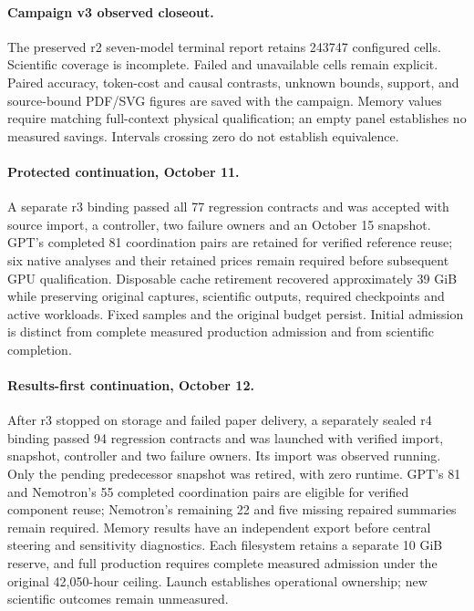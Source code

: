 \paragraph{Campaign v3 observed closeout.} The preserved r2 seven-model terminal report retains 243747 configured cells. Scientific coverage is incomplete. Failed and unavailable cells remain explicit. Paired accuracy, token-cost and causal contrasts, unknown bounds, support, and source-bound PDF/SVG figures are saved with the campaign. Memory values require matching full-context physical qualification; an empty panel establishes no measured savings. Intervals crossing zero do not establish equivalence.\par
\paragraph{Protected continuation, October 11.} A separate r3 binding passed all 77 regression contracts and was accepted with source import, a controller, two failure owners and an October 15 snapshot. GPT's completed 81 coordination pairs are retained for verified reference reuse; six native analyses and their retained prices remain required before subsequent GPU qualification. Disposable cache retirement recovered approximately 39 GiB while preserving original captures, scientific outputs, required checkpoints and active workloads. Fixed samples and the original budget persist. Initial admission is distinct from complete measured production admission and from scientific completion.\par
\paragraph{Results-first continuation, October 12.} After r3 stopped on storage and failed paper delivery, a separately sealed r4 binding passed 94 regression contracts and was launched with verified import, snapshot, controller and two failure owners. Its import was observed running. Only the pending predecessor snapshot was retired, with zero runtime. GPT's 81 and Nemotron's 55 completed coordination pairs are eligible for verified component reuse; Nemotron's remaining 22 and five missing repaired summaries remain required. Memory results have an independent export before central steering and sensitivity diagnostics. Each filesystem retains a separate 10 GiB reserve, and full production requires complete measured admission under the original 42,050-hour ceiling. Launch establishes operational ownership; new scientific outcomes remain unmeasured.\par
